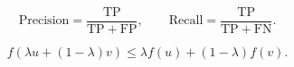 \begin{equation}
\mathrm{Precision}=\frac{\mathrm{TP}}{\mathrm{TP}+\mathrm{FP}},
\qquad
\mathrm{Recall}=\frac{\mathrm{TP}}{\mathrm{TP}+\mathrm{FN}}.
\label{eq:precision-recall}
\end{equation}

\begin{equation}
f(\lambda u+(1-\lambda)v)
\leq \lambda f(u)+(1-\lambda)f(v).
\label{eq:convex-definition}
\end{equation}

